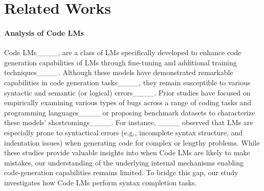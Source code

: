 \section{Related Works}

{\paragraph{Analysis of Code LMs} Code LMs____, are a class of LMs specifically developed to enhance code generation capabilities of LMs through fine-tuning and additional training techniques____. Although these models have demonstrated remarkable capabilities in code generation tasks____, they remain susceptible to various syntactic and semantic (or logical) errors____. Prior studies have focused on empirically examining various types of bugs across a range of coding tasks and programming languages____ or proposing benchmark datasets to characterize these models' shortcomings____. For instance, ____ observed that LMs are especially prone to syntactical errors (e.g., incomplete syntax structure, and indentation issues) when generating code for complex or lengthy problems. While these studies provide valuable insights into when Code LMs are likely to make mistakes, our understanding of the underlying internal mechanisms enabling code-generation capabilities remains limited. To bridge this gap, our study investigates how Code LMs perform syntax completion tasks.}

